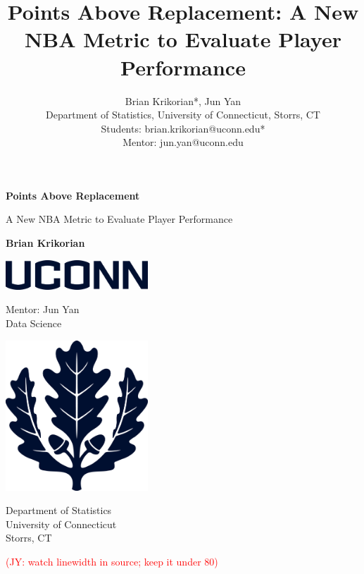 \documentclass[12pt, titlepage]{article}
\title{Points Above Replacement: A New NBA Metric to Evaluate Player Performance}
\author{
Brian Krikorian*, Jun Yan \\ \medskip 
Department of Statistics, University of Connecticut, Storrs, CT  \\  \medskip 
Students: brian.krikorian@uconn.edu* \\
Mentor: jun.yan@uconn.edu 
}
\newcommand{\jy}[1]{\textcolor{red}{(JY: #1)}}
\begin{document}
\begin{titlepage}
   \begin{center}
       \vspace*{1cm}
       \Huge
       \textbf{Points Above Replacement}

       \Large
       \vspace{0.5cm}
        A New NBA Metric to Evaluate Player Performance
            
       \vspace{1.5cm}

       \textbf{Brian Krikorian}
       
       \vfill

       \includegraphics[width=0.4\textwidth]{UCONNwordmark}

       \vfill
            
       Mentor: Jun Yan\\
       Data Science
            
       \vspace{0.8cm}
     
       \includegraphics[width=0.4\textwidth]{UCONNoakleaf}
         
        \Large    
       Department of Statistics\\
       University of Connecticut\\
       Storrs, CT\\
            
   \end{center}
 \end{titlepage}



\jy{watch linewidth in source; keep it under 80}
 
\end{document}
